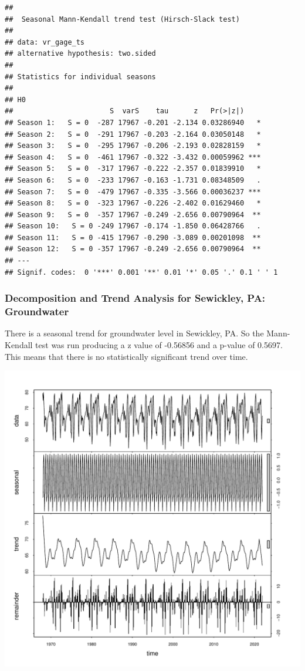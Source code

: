 \documentclass[
  12pt,
]{article}
\begin{document}
\begin{verbatim}
## 
##  Seasonal Mann-Kendall trend test (Hirsch-Slack test)
## 
## data: vr_gage_ts
## alternative hypothesis: two.sided
## 
## Statistics for individual seasons
## 
## H0
##                       S  varS    tau      z   Pr(>|z|)    
## Season 1:   S = 0  -287 17967 -0.201 -2.134 0.03286940   *
## Season 2:   S = 0  -291 17967 -0.203 -2.164 0.03050148   *
## Season 3:   S = 0  -295 17967 -0.206 -2.193 0.02828159   *
## Season 4:   S = 0  -461 17967 -0.322 -3.432 0.00059962 ***
## Season 5:   S = 0  -317 17967 -0.222 -2.357 0.01839910   *
## Season 6:   S = 0  -233 17967 -0.163 -1.731 0.08348509   .
## Season 7:   S = 0  -479 17967 -0.335 -3.566 0.00036237 ***
## Season 8:   S = 0  -323 17967 -0.226 -2.402 0.01629460   *
## Season 9:   S = 0  -357 17967 -0.249 -2.656 0.00790964  **
## Season 10:   S = 0 -249 17967 -0.174 -1.850 0.06428766   .
## Season 11:   S = 0 -415 17967 -0.290 -3.089 0.00201098  **
## Season 12:   S = 0 -357 17967 -0.249 -2.656 0.00790964  **
## ---
## Signif. codes:  0 '***' 0.001 '**' 0.01 '*' 0.05 '.' 0.1 ' ' 1
\end{verbatim}

\newpage

\hypertarget{decomposition-and-trend-analysis-for-sewickley-pa-groundwater}{%
\subsubsection{Decomposition and Trend Analysis for Sewickley, PA:
Groundwater}\label{decomposition-and-trend-analysis-for-sewickley-pa-groundwater}}

There is a seasonal trend for groundwater level in Sewickley, PA. So the
Mann-Kendall test was run producing a z value of -0.56856 and a p-value
of 0.5697. This means that there is no statistically significant trend
over time.

\includegraphics{Draft_Final_files/figure-latex/seasonality_4-1.pdf}
\end{document}
